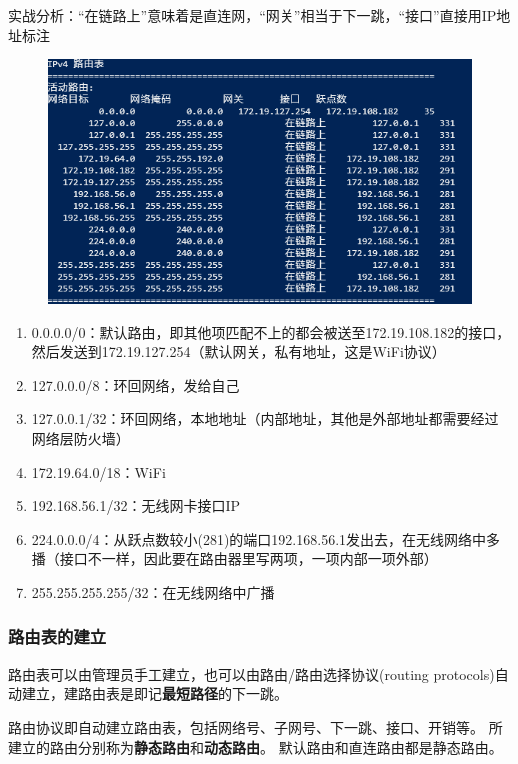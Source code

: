 \begin{example}
	实战分析：“在链路上”意味着是直连网，“网关”相当于下一跳，“接口”直接用IP地址标注
	\begin{figure}[H]
		\centering
		\includegraphics[width=0.6\linewidth]{fig/my-router-table.png}
	\end{figure}
\end{example}
\begin{analysis}
	\begin{enumerate}
		\item 0.0.0.0/0：默认路由，即其他项匹配不上的都会被送至172.19.108.182的接口，\\然后发送到172.19.127.254（默认网关，私有地址，这是WiFi协议）
		\item 127.0.0.0/8：环回网络，发给自己
		\item 127.0.0.1/32：环回网络，本地地址（内部地址，其他是外部地址都需要经过网络层防火墙）
		\item 172.19.64.0/18：WiFi
		\item 192.168.56.1/32：无线网卡接口IP
		\item 224.0.0.0/4：从跃点数较小(281)的端口192.168.56.1发出去，在无线网络中多播（接口不一样，因此要在路由器里写两项，一项内部一项外部）
		\item 255.255.255.255/32：在无线网络中广播
	\end{enumerate}
\end{analysis}

\subsubsection{路由表的建立}
路由表可以由管理员手工建立，也可以由路由/路由选择协议(routing protocols)自动建立，建路由表是即记\textbf{最短路径}的下一跳。

路由协议即自动建立路由表，包括网络号、子网号、下一跳、接口、开销等。
所建立的路由分别称为\textbf{静态路由}和\textbf{动态路由}。
默认路由和直连路由都是静态路由。

